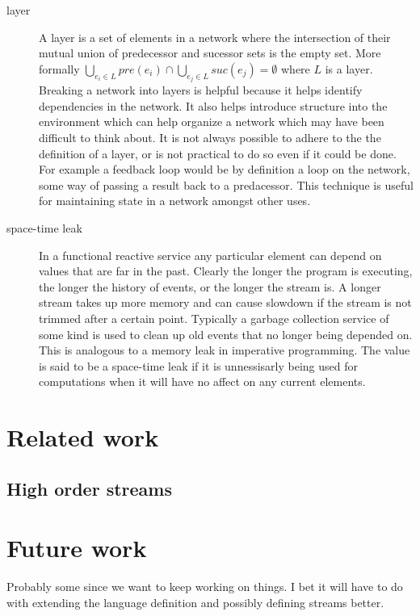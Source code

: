 \documentclass[twocolumn]{paper}
\begin{document}
\begin{description}
\item[layer] A layer is a set of elements in a network where the intersection of their mutual union of predecessor and sucessor sets is the empty set. More formally $\bigcup_{e_i \in L}{pre(e_i)} \cap \bigcup_{e_j \in L}{suc(e_j)} = \emptyset$ where $L$ is a layer. Breaking a network into layers is helpful because it helps identify dependencies in the network. It also helps introduce structure into the environment which can help organize a network which may have been difficult to think about. It is not always possible to adhere to the the definition of a layer, or is not practical to do so even if it could be done. For example a feedback loop would be by definition a loop on the network, some way of passing a result back to a predacessor. This technique is useful for maintaining state in a network amongst other uses.


\item[space-time leak] In a functional reactive service any particular element can depend on values that are far in the past. Clearly the longer the program is executing, the longer the history of events, or the longer the stream is. A longer stream takes up more memory and can cause slowdown if the stream is not trimmed after a certain point. Typically a garbage collection service of some kind is used to clean up old events that no longer being depended on. This is analogous to a memory leak in imperative programming. The value is said to be a space-time leak if it is unnessisarly being used for computations when it will have no affect on any current elements.
\end{description}
\section{Related work}
\subsection{High order streams}
\section{Future work}
Probably some since we want to keep working on things. I bet it will have to do with extending the language definition and possibly defining streams better.


{}

\end{document}
